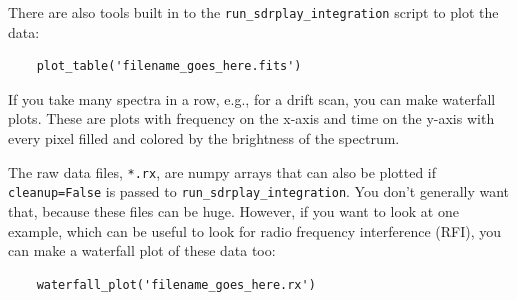 \documentclass[11pt]{article}
\begin{document}
There are also tools built in to the \verb|run_sdrplay_integration| script to plot the data:

\begin{verbatim}
    plot_table('filename_goes_here.fits')
\end{verbatim}

If you take many spectra in a row, e.g., for a drift scan, you can make waterfall plots.
These are plots with frequency on the x-axis and time on the y-axis with every pixel filled and colored by the brightness of the spectrum.

The raw data files, \verb|*.rx|, are numpy arrays that can also be plotted if \verb|cleanup=False| is passed to \verb|run_sdrplay_integration|.
You don't generally want that, because these files can be huge.
However, if you want to look at one example, which can be useful to look for radio frequency interference (RFI), you can make a waterfall plot of these data too:

\begin{verbatim}
    waterfall_plot('filename_goes_here.rx')
\end{verbatim}
\end{document}
